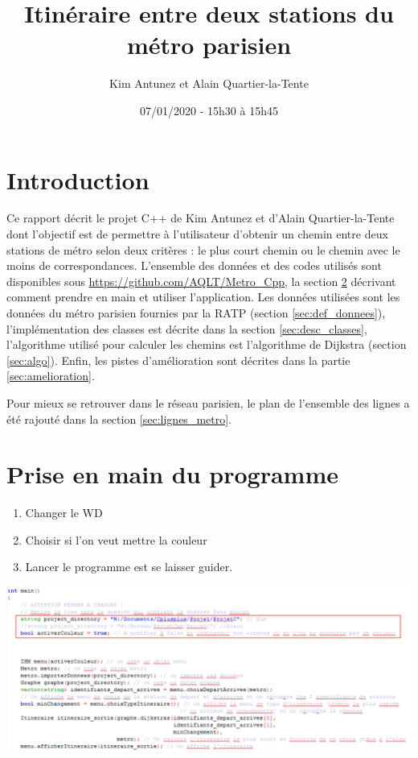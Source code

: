 \documentclass[,french]{article}
\title{Itinéraire entre deux stations du métro parisien}
\author{Kim Antunez et Alain Quartier-la-Tente}
\date{07/01/2020 - 15h30 à 15h45}
\begin{document}
\maketitle

{
\hypersetup{linkcolor=}
\setcounter{tocdepth}{2}
\tableofcontents
}
\hypertarget{introduction}{%
\section{Introduction}\label{introduction}}

Ce rapport décrit le projet C++ de Kim Antunez et d'Alain
Quartier-la-Tente dont l'objectif est de permettre à l'utilisateur
d'obtenir un chemin entre deux stations de métro selon deux critères :
le plus court chemin ou le chemin avec le moins de correspondances.
L'ensemble des données et des codes utilisés sont disponibles sous
\url{https://github.com/AQLT/Metro_Cpp}, la section
\ref{sec:pris_en_main} décrivant comment prendre en main et utiliser
l'application. Les données utilisées sont les données du métro parisien
fournies par la RATP (section \ref{sec:def_donnees}), l'implémentation
des classes est décrite dans la section \ref{sec:desc_classes},
l'algorithme utilisé pour calculer les chemins est l'algorithme de
Dijkstra (section \ref{sec:algo}). Enfin, les pistes d'amélioration sont
décrites dans la partie \ref{sec:amelioration}.

Pour mieux se retrouver dans le réseau parisien, le plan de l'ensemble
des lignes a été rajouté dans la section \ref{sec:lignes_metro}.

\hypertarget{sec:pris_en_main}{%
\section{Prise en main du programme}\label{sec:pris_en_main}}

\begin{enumerate}
\def\labelenumi{\arabic{enumi}.}
\item
  Changer le WD
\item
  Choisir si l'on veut mettre la couleur
\item
  Lancer le programme est se laisser guider.
\end{enumerate}

\includegraphics{img/main.png}
\end{document}
